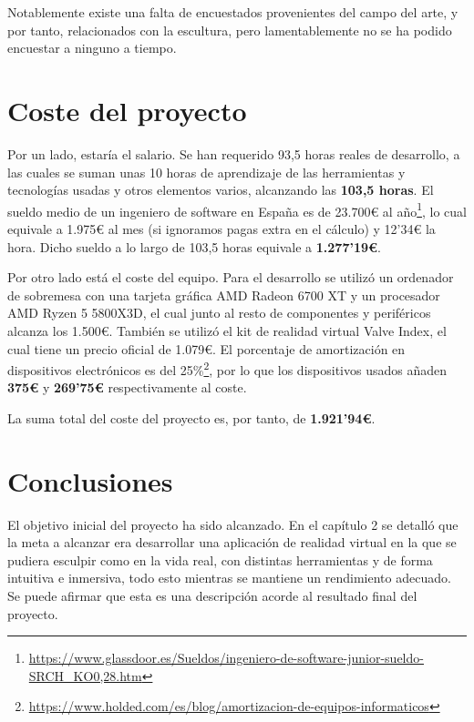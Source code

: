Notablemente existe una falta de encuestados provenientes del campo del arte, y por tanto, relacionados con la escultura, pero lamentablemente no se ha podido encuestar a ninguno a tiempo.

\section{Coste del proyecto}

Por un lado, estaría el salario. Se han requerido 93,5 horas reales de desarrollo, a las cuales se suman unas 10 horas de aprendizaje de las herramientas y tecnologías usadas y otros elementos varios, alcanzando las \textbf{103,5 horas}. El sueldo medio de un ingeniero de software en España es de 23.700€ al año\footnote{\url{https://www.glassdoor.es/Sueldos/ingeniero-de-software-junior-sueldo-SRCH_KO0,28.htm}}, lo cual equivale a 1.975€ al mes (si ignoramos pagas extra en el cálculo) y 12'34€ la hora. Dicho sueldo a lo largo de 103,5 horas equivale a \textbf{1.277'19€}.

Por otro lado está el coste del equipo. Para el desarrollo se utilizó un ordenador de sobremesa con una tarjeta gráfica AMD Radeon 6700 XT y un procesador AMD Ryzen 5 5800X3D, el cual junto al resto de componentes y periféricos alcanza los 1.500€. También se utilizó el kit de realidad virtual Valve Index, el cual tiene un precio oficial de 1.079€. El porcentaje de amortización en dispositivos electrónicos es del 25\%\footnote{\url{https://www.holded.com/es/blog/amortizacion-de-equipos-informaticos}}, por lo que los dispositivos usados añaden \textbf{375€} y \textbf{269'75€} respectivamente al coste. 

La suma total del coste del proyecto es, por tanto, de \textbf{1.921'94€}.

\section{Conclusiones}

El objetivo inicial del proyecto ha sido alcanzado. En el capítulo 2 se detalló que la meta a alcanzar era desarrollar una aplicación de realidad virtual en la que se pudiera esculpir como en la vida real, con distintas herramientas y de forma intuitiva e inmersiva, todo esto mientras se mantiene un rendimiento adecuado. Se puede afirmar que esta es una descripción acorde al resultado final del proyecto.


